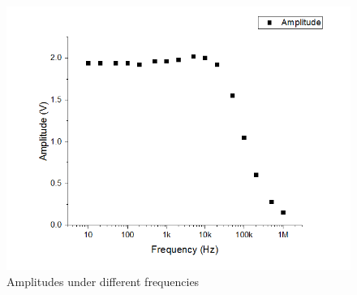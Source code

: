 \begin{figure}[!htbp]
	\centering 
	\begin{framed}
		\includegraphics[width=\linewidth]{images/amp_freq.PNG} 
		\caption{Amplitudes under different frequencies}
		\label{fig:afreq} 
	\end{framed}
\end{figure} 

